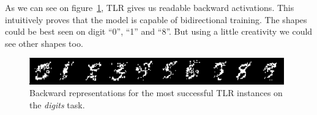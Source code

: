 As we can see on figure~\ref{fig:results-tlr-digits-backward}, TLR gives us readable backward activations. This intuitively proves that the model is capable of bidirectional training. The shapes could be best seen on digit ``0'', ``1'' and ``8''. But using a little creativity we could see other shapes too. 

\begin{figure}[H]
  \centering
  \includegraphics[width=0.98\textwidth]{img/tlr-digits.png}    
  \caption{Backward representations for the most successful TLR instances on the \emph{digits} task.}
  \label{fig:results-tlr-digits-backward} 
\end{figure}
